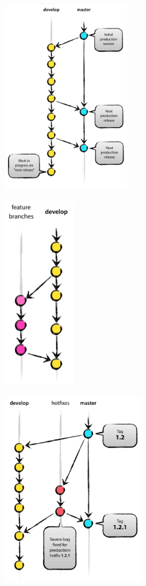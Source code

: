 \documentclass{beamer} %
\begin{document}
\begin{frame}
\begin{center}
\includegraphics[height=80mm]{assets/main-branches}
\end{center}
\end{frame}

\begin{frame}
\begin{center}
\includegraphics[height=80mm]{assets/feature-branches} 
\end{center}
\end{frame}

\begin{frame}
\begin{center}
\includegraphics[height=80mm]{assets/hotfix-branches} 
\end{center}
\end{frame}
\end{document}
